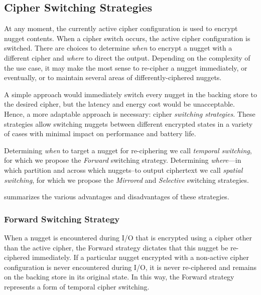 \subsection{Cipher Switching Strategies}


At any moment, the currently active cipher configuration is used to encrypt
nugget contents. When a cipher switch occurs, the active cipher configuration is
switched. There are choices to determine \emph{when} to encrypt a nugget with a
different cipher and \emph{where} to direct the output. Depending on the
complexity of the use case, it may make the most sense to re-cipher a nugget
immediately, or eventually, or to maintain several areas of differently-ciphered
nuggets.

A simple approach would immediately switch every nugget in the backing store to
the desired cipher, but the latency and energy cost would be unacceptable.
Hence, a more adaptable approach is necessary: cipher \emph{switching
strategies}. These strategies allow switching nuggets between different
encrypted states in a variety of cases with minimal impact on performance and
battery life.

Determining \emph{when} to target a nugget for re-ciphering we call
\emph{temporal switching}, for which we propose the \emph{Forward} switching
strategy. Determining \emph{where}---in which partition and across which
nuggets--to output ciphertext we call \emph{spatial switching}, for which we
propose the \emph{Mirrored} and \emph{Selective} switching strategies.

 summarizes the various advantages and
disadvantages of these strategies.

\subsubsection{Forward Switching Strategy}

When a nugget is encountered during I/O that is encrypted using a cipher other
than the active cipher, the Forward strategy dictates that this
nugget be re-ciphered immediately. If a particular nugget encrypted with a
non-active cipher configuration is never encountered during I/O, it is never
re-ciphered and remains on the backing store in its original state. In this way,
the Forward strategy represents a form of temporal cipher switching.

